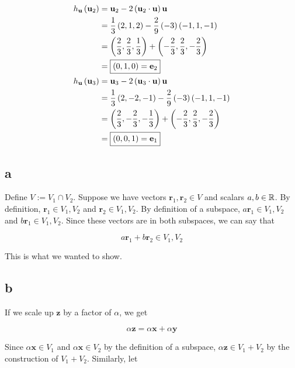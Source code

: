 \documentclass{article}
\begin{document}
\begin{align*}
  h_{\textbf{u}} \left ( \textbf{u}_2 \right) &= \textbf{u}_2 - 2 \left ( \textbf{u}_2 \cdot \textbf{u} \right) \textbf{u} \\
                             &= \frac{1}{3} \left ( 2, 1, 2 \right) - \frac{2}{9} \left ( -3 \right) \left ( -1, 1, -1 \right) \\
                             &= \left ( \frac{2}{3}, \frac{2}{3}, \frac{1}{3} \right) + \left ( -\frac{2}{3}, \frac{2}{3}, -\frac{2}{3} \right) \\
                             &= \boxed{\left ( 0, 1, 0 \right) = \textbf{e}_2} \\
  h_{\textbf{u}} \left ( \textbf{u}_3 \right) &= \textbf{u}_3 - 2 \left ( \textbf{u}_3 \cdot \textbf{u} \right) \textbf{u} \\
                             &= \frac{1}{3} \left ( 2, -2, -1 \right) - \frac{2}{9} \left ( -3 \right) \left ( -1, 1, -1 \right) \\
                             &= \left ( \frac{2}{3}, - \frac{2}{3}, - \frac{1}{3} \right) + \left ( - \frac{2}{3}, \frac{2}{3}, - \frac{2}{3} \right) \\
                             &= \boxed{\left ( 0, 0, 1 \right) = \textbf{e}_1} \\
\end{align*}




\subsection*{a}

Define $V := V_1 \cap V_2$.
Suppose we have vectors $\bm{r}_1, \bm{r}_2 \in V$ and scalars $a, b \in \mathbb R$.
By definition, $\bm{r}_1 \in V_1, V_2$ and $\bm{r}_2 \in V_1, V_2$.
By definition of a subspace, $a \bm{r}_1 \in V_1, V_2$ and $b \bm{r}_1 \in V_1, V_2$.
Since these vectors are in both subspaces, we can say that

$$
a \bm{r}_1 + b \bm{r}_2 \in V_1, V_2
$$

This is what we wanted to show.

\subsection*{b}

If we scale up $\bm{z}$ by a factor of $\alpha$, we get

$$
\alpha \bm{z} = \alpha \bm{x} + \alpha \bm{y}
$$

Since $\alpha \bm{x} \in V_1$ and $\alpha \bm{x} \in V_2$ by the definition of a subspace, $\alpha \bm{z} \in V_1 + V_2$ by the construction of $V_1 + V_2$.
Similarly, let
\end{document}
